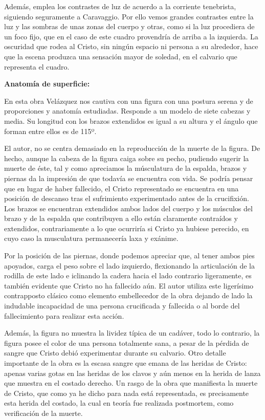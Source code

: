 Además, emplea los contrastes de luz de acuerdo a la corriente tenebrista, siguiendo seguramente a Caravaggio. Por ello vemos grandes contrastes entre la luz y las sombras de unas zonas del cuerpo y otras, como si la luz procediera de un foco fijo, que en el caso de este cuadro provendría de arriba a la izquierda. La oscuridad que rodea al Cristo, sin ningún espacio ni persona a su alrededor, hace que la escena produzca una sensación mayor de soledad, en el calvario que representa el cuadro.

\vspace{12pt}
\textbf{Anatomía de superficie:}

En esta obra Velázquez nos cautiva con una figura con una postura serena y de proporciones y anatomía estudiadas.  Responde a un modelo de siete cabezas y media. Su longitud con los brazos extendidos es igual a su altura y el ángulo que forman entre ellos es de 115º.

El autor, no se centra demasiado en la reproducción de la muerte de la figura. De hecho, aunque la cabeza de la figura caiga sobre su pecho, pudiendo sugerir la muerte de éste, tal y como apreciamos la músculatura de la espalda, brazos y piernas da la impresión de que todavía se encuentra con vida. Se podría pensar que en lugar de haber fallecido, el Cristo representado se encuentra en una posición de descanso tras el sufrimiento experimentado antes de la crucifixión. Los brazos se encuentran extendidos ambos lados del cuerpo y los músculos del brazo y de la espalda que contribuyen a ello están claramente contraídos y extendidos, contrariamente a lo que ocurriría si Cristo ya hubiese perecido, en cuyo caso la musculatura permanecería laxa y exánime.

Por la posición de las piernas, donde podemos apreciar que, al tener ambos pies apoyados, carga el peso sobre el lado izquierdo, flexionando la articulación de la rodilla de este lado e iclinando la cadera hacia el lado contrario ligeramente, es también evidente que Cristo no ha fallecido aún. El autor utiliza este ligerísimo contrapposto clásico como elemento embellecedor de la obra dejando de lado la indudable incapacidad de una persona crucificada y fallecida o al borde del fallecimiento para realizar esta acción.

Además, la figura no muestra la lividez típica de un cadáver, todo lo contrario, la figura posee el color de una persona totalmente sana, a pesar de la pérdida de sangre que Cristo debió experimentar durante su calvario. Otro detalle importante de la obra es la escasa sangre que emana de las heridas de Cristo: apenas varias gotas en las heridas de los clavos y aún menos en la herida de lanza que muestra en el costado derecho. Un rasgo de la obra que  manifiesta la muerte de Cristo, que como ya he dicho para nada está representada, es precisamente esta herida del costado, la cual en teoría fue realizada postmortem, como verificación de la muerte.

